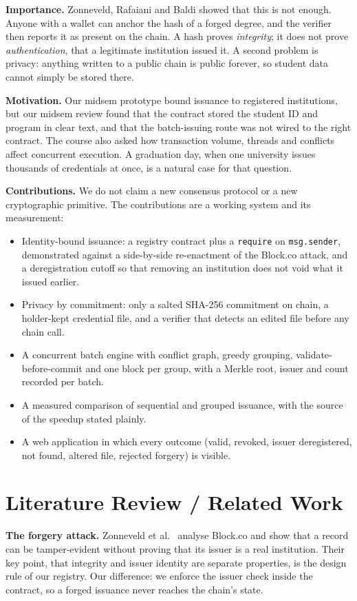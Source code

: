 \documentclass[10pt,twocolumn]{article}
\begin{document}
\textbf{Importance.} Zonneveld, Rafaiani and Baldi \cite{zonneveld2026} showed that this is not enough. Anyone with a wallet can anchor the hash of a forged degree, and the verifier then reports it as present on the chain. A hash proves \emph{integrity}; it does not prove \emph{authentication}, that a legitimate institution issued it. A second problem is privacy: anything written to a public chain is public forever, so student data cannot simply be stored there.

\textbf{Motivation.} Our midsem prototype bound issuance to registered institutions, but our midsem review found that the contract stored the student ID and program in clear text, and that the batch-issuing route was not wired to the right contract. The course also asked how transaction volume, threads and conflicts affect concurrent execution. A graduation day, when one university issues thousands of credentials at once, is a natural case for that question.

\textbf{Contributions.} We do not claim a new consensus protocol or a new cryptographic primitive. The contributions are a working system and its measurement:
\begin{itemize}
\item Identity-bound issuance: a registry contract plus a \texttt{require} on \texttt{msg.sender}, demonstrated against a side-by-side re-enactment of the Block.co attack, and a deregistration cutoff so that removing an institution does not void what it issued earlier.
\item Privacy by commitment: only a salted SHA-256 commitment on chain, a holder-kept credential file, and a verifier that detects an edited file before any chain call.
\item A concurrent batch engine with conflict graph, greedy grouping, validate-before-commit and one block per group, with a Merkle root, issuer and count recorded per batch.
\item A measured comparison of sequential and grouped issuance, with the source of the speedup stated plainly.
\item A web application in which every outcome (valid, revoked, issuer deregistered, not found, altered file, rejected forgery) is visible.
\end{itemize}

\section{Literature Review / Related Work}
\textbf{The forgery attack.} Zonneveld et al.\ \cite{zonneveld2026} analyse Block.co and show that a record can be tamper-evident without proving that its issuer is a real institution. Their key point, that integrity and issuer identity are separate properties, is the design rule of our registry. Our difference: we enforce the issuer check inside the contract, so a forged issuance never reaches the chain's state.
\end{document}
